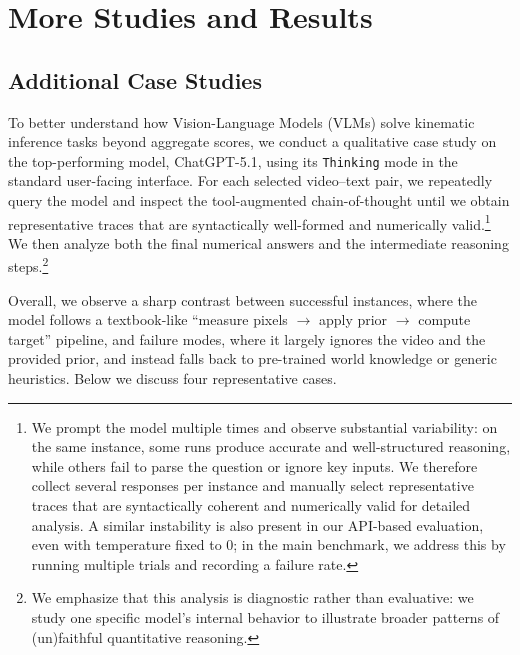 \section{More Studies and Results}
\label{appendix:more_studies}
\subsection{Additional Case Studies}

To better understand how Vision-Language Models (VLMs) solve kinematic inference tasks beyond aggregate scores, we conduct a qualitative case study on the top-performing model, ChatGPT-5.1, using its \texttt{Thinking} mode in the standard user-facing interface.
For each selected video–text pair, we repeatedly query the model and inspect the tool-augmented chain-of-thought until we obtain representative traces that are syntactically well-formed and numerically valid.\footnote{We prompt the model multiple times and observe substantial variability: on the same instance, some runs produce accurate and well-structured reasoning, while others fail to parse the question or ignore key inputs.
We therefore collect several responses per instance and manually select representative traces that are syntactically coherent and numerically valid for detailed analysis.
A similar instability is also present in our API-based evaluation, even with temperature fixed to $0$; in the main benchmark, we address this by running multiple trials and recording a failure rate.}
We then analyze both the final numerical answers and the intermediate reasoning steps.\footnote{We emphasize that this analysis is diagnostic rather than evaluative: we study one specific model’s internal behavior to illustrate broader patterns of (un)faithful quantitative reasoning.}


Overall, we observe a sharp contrast between successful instances, where the model follows a textbook-like “measure pixels $\rightarrow$ apply prior $\rightarrow$ compute target” pipeline,  and failure modes, where it largely ignores the video and the provided prior, and instead falls back to pre-trained world knowledge or generic heuristics.
Below we discuss four representative cases.

